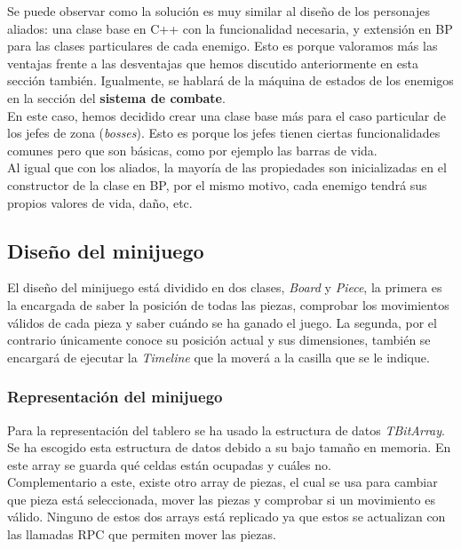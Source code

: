 Se puede observar como la solución es muy similar al diseño de los personajes aliados: una clase base en C++ con la funcionalidad necesaria, y extensión en \ac{BP} para las clases particulares de cada enemigo. Esto es porque valoramos más las ventajas frente a las desventajas que hemos discutido anteriormente en esta sección también. Igualmente, se hablará de la máquina de estados de los enemigos en la sección del \textbf{sistema de combate}.
\\

En este caso, hemos decidido crear una clase base más para el caso particular de los jefes de zona (\textit{bosses}). Esto es porque los jefes tienen ciertas funcionalidades comunes pero que son básicas, como por ejemplo las barras de vida.
\\

Al igual que con los aliados, la mayoría de las propiedades son inicializadas en el constructor de la clase en \ac{BP}, por el mismo motivo, cada enemigo tendrá sus propios valores de vida, daño, etc.

\subsection{Diseño del minijuego}
El diseño del minijuego está dividido en dos clases, \textit{Board} y \textit{Piece}, la primera es la encargada de saber la posición de todas las piezas, comprobar los movimientos válidos de cada pieza y saber cuándo se ha ganado el juego. La segunda, por el contrario únicamente conoce su posición actual y sus dimensiones, también se encargará de ejecutar la \textit{Timeline} que la moverá a la casilla que se le indique. \\

\subsubsection{Representación del minijuego}
Para la representación del tablero se ha usado la estructura de datos \textit{TBitArray}. Se ha escogido esta estructura de datos debido a su bajo tamaño en memoria. En este array se guarda qué celdas están ocupadas y cuáles no. \\

Complementario a este, existe otro array de piezas, el cual se usa para cambiar que pieza está seleccionada, mover las piezas y comprobar si un movimiento es válido. Ninguno de estos dos arrays está replicado ya que estos se actualizan con las llamadas \ac{RPC} que permiten mover las piezas. \\

